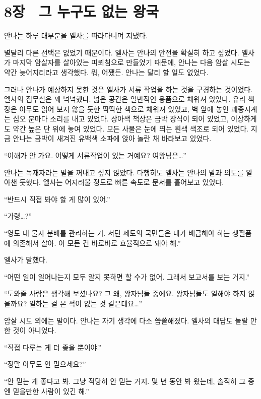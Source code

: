 

\chapter[8장  그 누구도 없는 왕국][8장\hspace*{.5em}그 누구도 없는 왕국]{8장 \ 그 누구도 없는 왕국}



안나는 하루 대부분을 엘사를 따라다니며 지냈다.

별달리 다른 선택은 없었기 때문이다. 엘사는 안나의 안전을 확실히 하고 싶었다. 엘사가 마지막 암살자를 살아있는 피뢰침으로 만들었기 때문에, 안나는 다음 암살 시도는 약간 늦어지리라고 생각했다. 뭐, 어쨌든. 안나는 달리 할 일도 없었다.

그러나 안나가 예상하지 못한 것은 엘사가 서류 작업을 하는 것을 구경하는 것이었다. 엘사의 집무실은 꽤 넉넉했다. 넓은 공간은 일반적인 용품으로 채워져 있었다. 유리 책장은 아무도 읽어 보지 않을 듯한 딱딱한 책으로 채워져 있었고, 벽 앞에 놓인 괘종시계는 십오 분마다 소리를 내고 있었다. 상아색 책상은 금박 장식이 되어 있었고, 이상하게도 약간 높은 단 위에 놓여 있었다. 모든 사물은 눈에 띄는 흰색 색조로 되어 있었다. 지금 안나는 금박이 새겨진 유백색 소파에 앉아 놀란 채 바라보고 있었다.

``이해가 안 가요. 어떻게 서류작업이 있는 거예요? 여왕님은\ldots''

안나는 독재자라는 말을 꺼내고 싶지 않았다. 다행히도 엘사는 안나의 말과 의도를 알아챈 듯했다. 엘사는 어지러울 정도로 빠른 속도로 문서를 훑어보고 있었다.

``반드시 직접 봐야 할 게 많이 있어.''

``가령\ldots?''

``영토 내 물자 분배를 관리하는 거. 서던 제도의 국민들은 내가 배급해야 하는 생필품에 의존해서 살아. 이 모든 건 바로바로 효율적으로 돼야 해.''

엘사가 말했다.

``어떤 일이 일어나는지 모두 알지 못하면 할 수가 없어. 그래서 보고서를 보는 거지.''

``도와줄 사람은 생각해 보셨나요? 그 왜, 왕자님들 중에요. 왕자님들도 일해야 하지 않을까요? 일하는 걸 본 적이 없는 것 같은데요\ldots''

암살 시도 외에는 말이다. 안나는 자기 생각에 다소 씁쓸해졌다. 엘사의 대답도 놀랄 만한 것이 아니었다.

``직접 다루는 게 더 좋을 뿐이야.''

``정말 아무도 안 믿으세요?''

``안 믿는 게 좋다고 봐. 그냥 적당히 안 믿는 거지. 몇 년 동안 봐 왔는데, 솔직히 그 중엔 믿을만한 사람이 있긴 해.''

